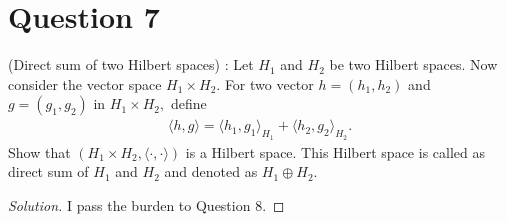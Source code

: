 \section{Question 7}

\horz

(Direct sum of two Hilbert spaces) : Let $H_1$ and $H_2$ be two Hilbert spaces. Now consider the vector space $H_1\times H_2.$ For two vector $h=(h_1,h_2)$ and $g=(g_1,g_2)$ in $H_1\times H_2,$ define
\begin{align*}
\langle h,g\rangle = \langle h_1,g_1\rangle_{H_1} + \langle h_2,g_2\rangle_{H_2}.
\end{align*}
Show that  $(H_1\times H_2, \langle \cdot,\cdot\rangle )$ is a Hilbert space. This Hilbert space is called as direct sum of $H_1$ and $H_2$ and denoted as $H_1\oplus H_2.$ 

\horz

\begin{proof}[Solution]
    I pass the burden to Question 8.
\end{proof}
